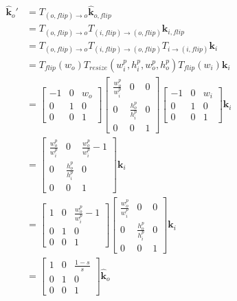 \documentclass[10pt,journal,compsoc]{IEEEtran}
\begin{document}
\begin{equation}
\label{eq:inference4}
    \begin{split}
    \hat{\textbf{k}}_o' &= T_{(o,flip)\rightarrow o}\hat{\textbf{k}}_{o,flip}\\
                        &= T_{(o,flip)\rightarrow o}T_{(i,flip)\rightarrow (o,flip)}\textbf{k}_{i,flip} \\
                        &= T_{(o,flip)\rightarrow o}T_{(i,flip)\rightarrow (o,flip)}T_{i \rightarrow (i,flip)}\textbf{k}_{i} \\
                        &= T_{flip}(w_o)T_{resize}(w_i^p,h_i^p,w_o^p,h_o^p)T_{flip}(w_i)\textbf{k}_{i} \\
                        &= \begin{bmatrix} -1 & 0 & w_o \\
                    0 & 1 & 0 \\
                    0 & 0 &1 \end{bmatrix}\begin{bmatrix} \frac{w_o^p}{w_i^p} & 0 & 0 \\
                    0 & \frac{h_o^p}{h_i^p} & 0 \\
                    0 & 0 &1 \end{bmatrix}\begin{bmatrix} -1 & 0 & w_i \\
                    0 & 1 & 0 \\
                    0 & 0 &1 \end{bmatrix}\textbf{k}_{i}\\
                        &= \begin{bmatrix} \frac{w_o^p}{w_i^p} & 0 & \frac{w_o^p}{w_i^p}-1 \\
                    0 & \frac{h_o^p}{h_i^p} & 0 \\
                    0 & 0 &1 \end{bmatrix}\textbf{k}_i\\
                        &= \begin{bmatrix} 1 & 0 & \frac{w_o^p}{w_i^p}-1 \\
                    0 & 1 & 0 \\
                    0 & 0 &1 \end{bmatrix}\begin{bmatrix} \frac{w_o^p}{w_i^p} & 0 & 0 \\
                    0 & \frac{h_o^p}{h_i^p} & 0 \\
                    0 & 0 &1 \end{bmatrix}\textbf{k}_i\\
                        &= \begin{bmatrix} 1 & 0 & \frac{1-s}{s} \\
                    0 & 1 & 0 \\
                    0 & 0 &1 \end{bmatrix}\hat{\textbf{k}}_o\\
    \end{split}
\end{equation}
\end{document}
